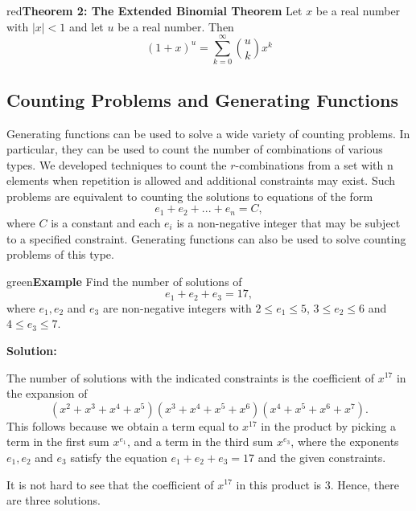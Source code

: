 \documentclass[11pt]{article}
\newenvironment{example}[1][\unskip]{\begin{mybox}{green}{\textbf{Example} {#1}}}{\end{mybox}}
\newenvironment{theorem}[1]{\begin{mybox}{red}{\textbf{Theorem #1}}}{\end{mybox}}
\begin{document}
\begin{theorem}{2: The Extended Binomial Theorem}
Let $x$ be a real number with $|x| < 1$ and let $u$ be a real number. Then
\begin{equation*}
(1+x)^u = \sum_{k=0}^{\infty} \binom{u}{k}x^k    
\end{equation*}
\end{theorem}



\subsection{Counting Problems and Generating Functions}

Generating functions can be used to solve a wide variety of counting problems. In particular, they can be used to count the number of combinations of various types. We developed techniques to count the $r$-combinations from a set with n elements when repetition is allowed and additional constraints may exist. Such problems are equivalent to counting the solutions to equations of the form
\begin{equation*}
e_1 + e_2 + ... + e_n = C,    
\end{equation*}
where $C$ is a constant and each $e_i$ is a non-negative integer that may be subject to a specified constraint. Generating functions can also be used to solve counting problems of this type.

\begin{example}
Find the number of solutions of 
\begin{equation*}
    e_1 + e_2 + e_3 = 17,
\end{equation*}
where $e_1, e_2$ and $e_3$ are non-negative integers with $2 \leq e_1 \leq 5$, $3 \leq e_2 \leq 6$ and $4 \leq e_3 \leq 7$.

\textbf{Solution:}

The number of solutions with the indicated constraints is the coefficient of $x^{17}$ in the expansion of
\begin{equation*}
    (x^2 + x^3 + x^4 + x^5)(x^3 + x^4 + x^5 + x^6)(x^4 + x^5 + x^6 + x^7).
\end{equation*}
This follows because we obtain a term equal to $x^{17}$ in the product by picking a term in the first sum $x^{e_1}$, and a term in the third sum $x^{e_3}$, where the exponents $e_1, e_2$ and $e_3$ satisfy the equation $e_1 + e_2 + e_3 = 17$ and the given constraints. 

It is not hard to see that the coefficient of $x^{17}$ in this product is 3. Hence, there are three solutions.
\end{example}
\end{document}
